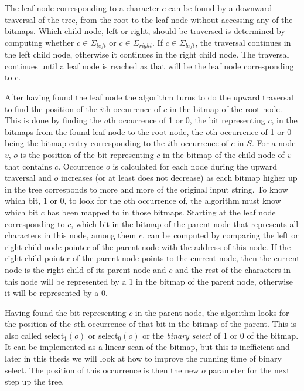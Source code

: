 The leaf node corresponding to a character $c$ can be found by a downward traversal of the tree, from the root to the leaf node without accessing any of the bitmaps.
Which child node, left or right, should be traversed is determined by computing whether $c \in \Sigma_{\mathit{left}}$ or $c \in \Sigma_{\mathit{right}}$.
If $c \in \Sigma_{\mathit{left}}$, the traversal continues in the left child node, otherwise it continues in the right child node.
The traversal continues until a leaf node is reached as that will be the leaf node corresponding to $c$.

After having found the leaf node the algorithm turns to do the upward traversal to find the position of the $i$th occurrence of $c$ in the bitmap of the root node.
This is done by finding the $o$th occurrence of 1 or 0, the bit representing $c$, in the bitmaps from the found leaf node to the root node, the $o$th occurrence of 1 or 0 being the bitmap entry corresponding to the $i$th occurrence of $c$ in $S$.
For a node $v$, $o$ is the position of the bit representing $c$ in the bitmap of the child node of $v$ that contains $c$.
Occurrence $o$ is calculated for each node during the upward traversal and $o$ increases (or at least does not decrease) as each bitmap higher up in the tree corresponds to more and more of the original input string.
To know which bit, 1 or 0, to look for the $o$th occurrence of, the algorithm must know which bit $c$ has been mapped to in those bitmaps.
Starting at the leaf node corresponding to $c$,  which bit in the bitmap of the parent node that represents all characters in this node, among them $c$, can be computed by comparing the left or right child node pointer of the parent node with the address of this node.
If the right child pointer of the parent node points to the current node, then the current node is the right child of its parent node and $c$ and the rest of the characters in this node will be represented by a 1 in the bitmap of the parent node, otherwise it will be represented by a 0.

Having found the bit representing $c$ in the parent node, the algorithm looks for the position of the $o$th occurrence of that bit in the bitmap of the parent.
This is also called select$_1(o)$ or select$_0(o)$ or the \textit{binary select} of 1 or 0 of the bitmap.
It can be implemented as a linear scan of the bitmap, but this is inefficient and later in this thesis we will look at how to improve the running time of binary select.
The position of this occurrence is then the new $o$ parameter for the next step up the tree.

